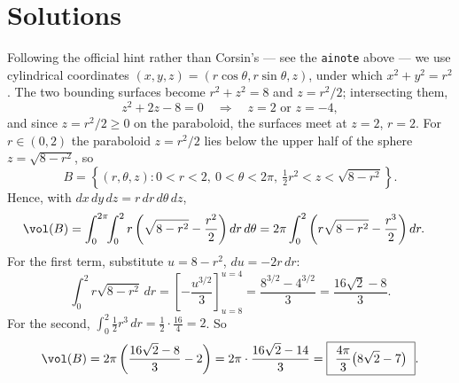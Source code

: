 
\section{Solutions}
\label{sec:gram_determinant_solutions}

\begin{exercisesolution}
\label{ex:solution_9.1}
Following the official hint rather than Corsin's --- see the \texttt{ainote} above --- we use
cylindrical coordinates $(x,y,z) = (r\cos\theta,r\sin\theta,z)$, under which $x^2+y^2=r^2$.
The two bounding surfaces become $r^2+z^2=8$ and $z = r^2/2$; intersecting them,
\[z^2+2z-8 = 0 \quad\Longrightarrow\quad z = 2 \text{ or } z=-4,\]
and since $z=r^2/2\geq0$ on the paraboloid, the surfaces meet at $z=2$, $r=2$. For
$r \in (0,2)$ the paraboloid $z=r^2/2$ lies below the upper half of the sphere
$z=\sqrt{8-r^2}$, so
\[B = \left\{(r,\theta,z) : 0<r<2,\ 0<\theta<2\pi,\ \tfrac12r^2 < z < \sqrt{8-r^2}\right\}.\]
Hence, with $dx\,dy\,dz = r\,dr\,d\theta\,dz$,
\[
\begin{aligned}
\vol(B) &= \int_0^{2\pi}\!\!\int_0^2 r\left(\sqrt{8-r^2} - \frac{r^2}{2}\right)dr\,d\theta
  = 2\pi\int_0^2 \left(r\sqrt{8-r^2} - \frac{r^3}{2}\right)dr.
\end{aligned}
\]
For the first term, substitute $u = 8-r^2$, $du=-2r\,dr$:
\[\int_0^2 r\sqrt{8-r^2}\,dr = \left[-\frac{u^{3/2}}{3}\right]_{u=8}^{u=4}
  = \frac{8^{3/2}-4^{3/2}}{3} = \frac{16\sqrt2-8}{3}.\]
For the second, $\int_0^2 \tfrac12 r^3\,dr = \tfrac12\cdot\tfrac{16}{4} = 2$. So
\[\vol(B) = 2\pi\left(\frac{16\sqrt2-8}{3} - 2\right) = 2\pi\cdot\frac{16\sqrt2-14}{3}
  = \boxed{\ \frac{4\pi}{3}\big(8\sqrt2-7\big)\ }.\]
\end{exercisesolution}

